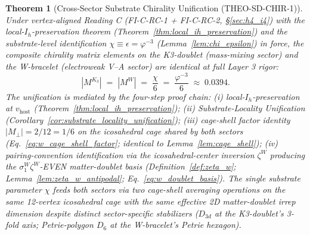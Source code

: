 \documentclass[11pt,letterpaper]{article}
\newtheorem{theorem}{Theorem}[section]
\newcommand{\phig}{\varphi}
\newcommand{\Kthree}{\ensuremath{K_3}}
\newcommand{\Dsix}{D_6}
\begin{document}
\begin{theorem}[Cross-Sector Substrate Chirality Unification (THEO-SD-CHIR-1)]\label{thm:theo_sd_chir_1}
Under vertex-aligned Reading C (FI-C-RC-1 + FI-C-RC-2, \S\ref{sec:h4_i4}) with the local-$I_h$-preservation theorem (Theorem~\ref{thm:local_ih_preservation}) and the substrate-level identification $\chi \equiv \epsilon = \phig^{-3}$ (Lemma~\ref{lem:chi_epsilon}) in force, the composite chirality matrix elements on the K3-doublet (mass-mixing sector) and the W-bracelet (electroweak V--A sector) are identical at full Layer 3 rigor:
\begin{equation}\label{eq:theo_sd_chir_1}
|M^{\Kthree}| \;=\; |M^W| \;=\; \frac{\chi}{6} \;=\; \frac{\phig^{-3}}{6} \;\approx\; 0.0394.
\end{equation}
The unification is mediated by the four-step proof chain: (i) local-$I_h$-preservation at $v_{\text{host}}$ (Theorem~\ref{thm:local_ih_preservation}); (ii) Substrate-Locality Unification (Corollary~\ref{cor:substrate_locality_unification}); (iii) cage-shell factor identity $|M_\perp| = 2/12 = 1/6$ on the icosahedral cage shared by both sectors (Eq.~\eqref{eq:w_cage_shell_factor}; identical to Lemma~\ref{lem:cage_shell}); (iv) pairing-convention identification via the icosahedral-center inversion $\zeta^W$ producing the $\sigma_1^W \zeta^W$-EVEN matter-doublet basis (Definition~\ref{def:zeta_w}; Lemma~\ref{lem:zeta_w_antipodal}; Eq.~\eqref{eq:w_doublet_basis}). The single substrate parameter $\chi$ feeds both sectors via two cage-shell averaging operations on the same 12-vertex icosahedral cage with the same effective 2D matter-doublet irrep dimension despite distinct sector-specific stabilizers ($D_{3d}$ at the K3-doublet's 3-fold axis; Petrie-polygon $\Dsix$ at the W-bracelet's Petrie hexagon).
\end{theorem}
\end{document}

